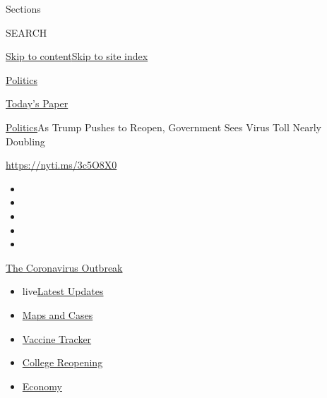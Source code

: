 Sections

SEARCH

\protect\hyperlink{site-content}{Skip to
content}\protect\hyperlink{site-index}{Skip to site index}

\href{https://www.nytimes3xbfgragh.onion/section/politics}{Politics}

\href{https://myaccount.nytimes3xbfgragh.onion/auth/login?response_type=cookie\&client_id=vi}{}

\href{https://www.nytimes3xbfgragh.onion/section/todayspaper}{Today's
Paper}

\href{/section/politics}{Politics}\textbar{}As Trump Pushes to Reopen,
Government Sees Virus Toll Nearly Doubling

\url{https://nyti.ms/3c5O8X0}

\begin{itemize}
\item
\item
\item
\item
\item
\end{itemize}

\href{https://www.nytimes3xbfgragh.onion/news-event/coronavirus?action=click\&pgtype=Article\&state=default\&region=TOP_BANNER\&context=storylines_menu}{The
Coronavirus Outbreak}

\begin{itemize}
\tightlist
\item
  live\href{https://www.nytimes3xbfgragh.onion/2020/08/04/world/coronavirus-cases.html?action=click\&pgtype=Article\&state=default\&region=TOP_BANNER\&context=storylines_menu}{Latest
  Updates}
\item
  \href{https://www.nytimes3xbfgragh.onion/interactive/2020/us/coronavirus-us-cases.html?action=click\&pgtype=Article\&state=default\&region=TOP_BANNER\&context=storylines_menu}{Maps
  and Cases}
\item
  \href{https://www.nytimes3xbfgragh.onion/interactive/2020/science/coronavirus-vaccine-tracker.html?action=click\&pgtype=Article\&state=default\&region=TOP_BANNER\&context=storylines_menu}{Vaccine
  Tracker}
\item
  \href{https://www.nytimes3xbfgragh.onion/2020/08/02/us/covid-college-reopening.html?action=click\&pgtype=Article\&state=default\&region=TOP_BANNER\&context=storylines_menu}{College
  Reopening}
\item
  \href{https://www.nytimes3xbfgragh.onion/live/2020/08/04/business/stock-market-today-coronavirus?action=click\&pgtype=Article\&state=default\&region=TOP_BANNER\&context=storylines_menu}{Economy}
\end{itemize}

